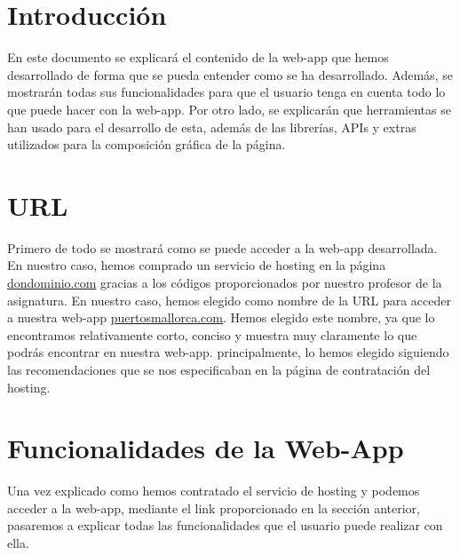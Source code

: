 \documentclass{article}
\begin{document}
\section{Introducción}
En este documento se explicará el contenido de la web-app que hemos desarrollado de forma que se pueda entender como se ha desarrollado. Además, se mostrarán todas sus funcionalidades para que el usuario tenga en cuenta todo lo que puede hacer con la web-app. Por otro lado, se explicarán que herramientas se han usado para el desarrollo de esta, además de las librerías, APIs y extras utilizados para la composición gráfica de la página.

\section{URL}
Primero de todo se mostrará como se puede acceder a la web-app desarrollada. En nuestro caso, hemos comprado un servicio de hosting en la página \href{https://www.dondominio.com/es/}{dondominio.com} gracias a los códigos proporcionados por nuestro profesor de la asignatura. En nuestro caso, hemos elegido como nombre de la URL para acceder a nuestra web-app \href{http://www.puertosmallorca.com/}{puertosmallorca.com}. Hemos elegido este nombre, ya que lo encontramos relativamente corto, conciso y muestra muy claramente lo que podrás encontrar en nuestra web-app. principalmente, lo hemos elegido siguiendo las recomendaciones que se nos especificaban en la página de contratación del hosting.

\section{Funcionalidades de la Web-App}
Una vez explicado como hemos contratado el servicio de hosting y podemos acceder a la web-app, mediante el link proporcionado en la sección anterior, pasaremos a explicar todas las funcionalidades que el usuario puede realizar con ella.
\end{document}
